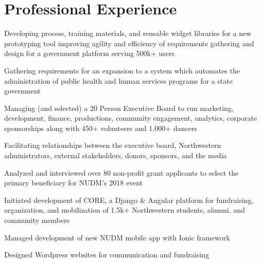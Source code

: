 
\section{Professional Experience}

\vspace{\topsep}
\begin{listitems}
\item Developing process, training materials, and reusable widget libraries for a new prototyping tool improving agility and efficiency of requirements gathering and design for a government platform serving 500k+ users
\item Gathering requirements for an expansion to a system which automates the administration of public health and human services programs for a state government
\end{listitems}
\sectionsep

\begin{listitems}
\item Managing (and selected) a 20 Person Executive Board to run marketing, development, finance, productions, community engagement, analytics, corporate sponsorships along with 450+ volunteers and 1,000+ dancers
\item Facilitating relationships between the executive board, Northwestern administrators, external stakeholders, donors, sponsors, and the media
\item Analyzed and interviewed over 80 non-profit grant applicants to select the primary beneficiary for NUDM's 2018 event
\end{listitems}
\begin{listitems}
\item Initiated development of CORE, a Django \& Angular platform for fundraising, organization, and mobilization of 1.5k+ Northwestern students, alumni, and community members
\item Managed development of new NUDM mobile app with Ionic framework
\item Designed Wordpress websites for communication and fundraising
\end{listitems}
\sectionsep

